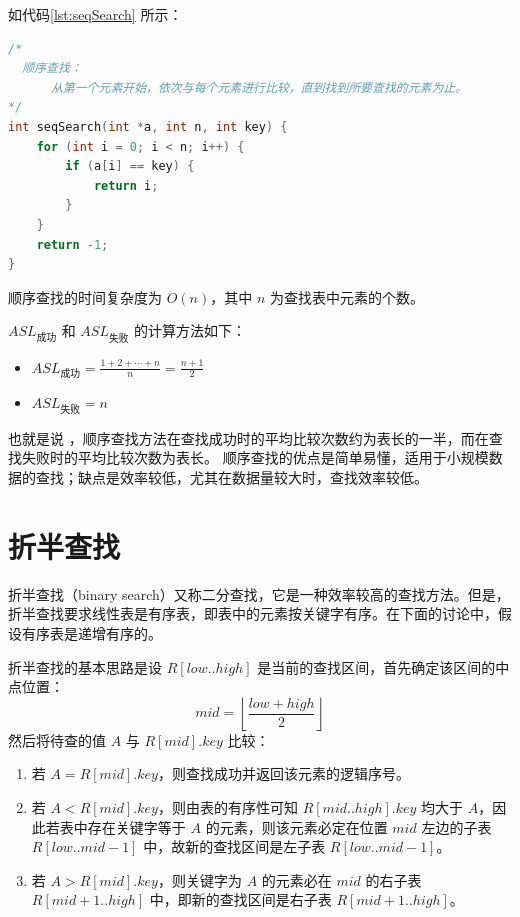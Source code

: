 \documentclass[lang=cn,newtx,10pt,scheme=chinese]{elegantbook}
\begin{document}
如代码\ref{lst:seqSearch} 所示：

\begin{lstlisting}[language=C++, caption={顺序查找算法} label={lst:seqSearch}]
  /*
  顺序查找：
      从第一个元素开始，依次与每个元素进行比较，直到找到所要查找的元素为止。
*/
int seqSearch(int *a, int n, int key) {
    for (int i = 0; i < n; i++) {
        if (a[i] == key) {
            return i;
        }
    }
    return -1;
}

\end{lstlisting}

顺序查找的时间复杂度为 $O(n)$，其中 $n$ 为查找表中元素的个数。

$ASL_{\text{成功}}$ 和 $ASL_{\text{失败}}$ 的计算方法如下：

\begin{itemize}
  \item $ASL_{\text{成功}} = \frac{1 + 2 + \cdots + n}{n} = \frac{n + 1}{2}$
  \item $ASL_{\text{失败}} = n$
  \end{itemize}

也就是说 ，顺序查找方法在查找成功时的平均比较次数约为表长的一半，而在查找失败时的平均比较次数为表长。
顺序查找的优点是简单易懂，适用于小规模数据的查找；缺点是效率较低，尤其在数据量较大时，查找效率较低。

\section{折半查找}
折半查找（binary search）又称二分查找，它是一种效率较高的查找方法。但是，折半查找要求线性表是有序表，即表中的元素按关键字有序。在下面的讨论中，假设有序表是递增有序的。

折半查找的基本思路是设 $R[low..high]$ 是当前的查找区间，首先确定该区间的中点位置：
\[
mid = \left\lfloor \frac{low + high}{2} \right\rfloor
\]
然后将待查的值 $A$ 与 $R[mid].key$ 比较：

\begin{enumerate}
  \item 若 $A = R[mid].key$，则查找成功并返回该元素的逻辑序号。
  \item 若 $A < R[mid].key$，则由表的有序性可知 $R[mid..high].key$ 均大于 $A$，因此若表中存在关键字等于 $A$ 的元素，则该元素必定在位置 $mid$ 左边的子表 $R[low..mid-1]$ 中，故新的查找区间是左子表 $R[low..mid-1]$。
  \item 若 $A > R[mid].key$，则关键字为 $A$ 的元素必在 $mid$ 的右子表 $R[mid+1..high]$ 中，即新的查找区间是右子表 $R[mid+1..high]$。
\end{enumerate}
\end{document}
